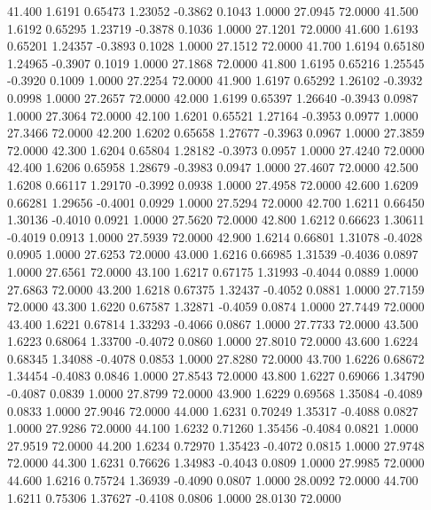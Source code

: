   41.400   1.6191   0.65473   1.23052  -0.3862   0.1043   1.0000  27.0945  72.0000
  41.500   1.6192   0.65295   1.23719  -0.3878   0.1036   1.0000  27.1201  72.0000
  41.600   1.6193   0.65201   1.24357  -0.3893   0.1028   1.0000  27.1512  72.0000
  41.700   1.6194   0.65180   1.24965  -0.3907   0.1019   1.0000  27.1868  72.0000
  41.800   1.6195   0.65216   1.25545  -0.3920   0.1009   1.0000  27.2254  72.0000
  41.900   1.6197   0.65292   1.26102  -0.3932   0.0998   1.0000  27.2657  72.0000
  42.000   1.6199   0.65397   1.26640  -0.3943   0.0987   1.0000  27.3064  72.0000
  42.100   1.6201   0.65521   1.27164  -0.3953   0.0977   1.0000  27.3466  72.0000
  42.200   1.6202   0.65658   1.27677  -0.3963   0.0967   1.0000  27.3859  72.0000
  42.300   1.6204   0.65804   1.28182  -0.3973   0.0957   1.0000  27.4240  72.0000
  42.400   1.6206   0.65958   1.28679  -0.3983   0.0947   1.0000  27.4607  72.0000
  42.500   1.6208   0.66117   1.29170  -0.3992   0.0938   1.0000  27.4958  72.0000
  42.600   1.6209   0.66281   1.29656  -0.4001   0.0929   1.0000  27.5294  72.0000
  42.700   1.6211   0.66450   1.30136  -0.4010   0.0921   1.0000  27.5620  72.0000
  42.800   1.6212   0.66623   1.30611  -0.4019   0.0913   1.0000  27.5939  72.0000
  42.900   1.6214   0.66801   1.31078  -0.4028   0.0905   1.0000  27.6253  72.0000
  43.000   1.6216   0.66985   1.31539  -0.4036   0.0897   1.0000  27.6561  72.0000
  43.100   1.6217   0.67175   1.31993  -0.4044   0.0889   1.0000  27.6863  72.0000
  43.200   1.6218   0.67375   1.32437  -0.4052   0.0881   1.0000  27.7159  72.0000
  43.300   1.6220   0.67587   1.32871  -0.4059   0.0874   1.0000  27.7449  72.0000
  43.400   1.6221   0.67814   1.33293  -0.4066   0.0867   1.0000  27.7733  72.0000
  43.500   1.6223   0.68064   1.33700  -0.4072   0.0860   1.0000  27.8010  72.0000
  43.600   1.6224   0.68345   1.34088  -0.4078   0.0853   1.0000  27.8280  72.0000
  43.700   1.6226   0.68672   1.34454  -0.4083   0.0846   1.0000  27.8543  72.0000
  43.800   1.6227   0.69066   1.34790  -0.4087   0.0839   1.0000  27.8799  72.0000
  43.900   1.6229   0.69568   1.35084  -0.4089   0.0833   1.0000  27.9046  72.0000
  44.000   1.6231   0.70249   1.35317  -0.4088   0.0827   1.0000  27.9286  72.0000
  44.100   1.6232   0.71260   1.35456  -0.4084   0.0821   1.0000  27.9519  72.0000
  44.200   1.6234   0.72970   1.35423  -0.4072   0.0815   1.0000  27.9748  72.0000
  44.300   1.6231   0.76626   1.34983  -0.4043   0.0809   1.0000  27.9985  72.0000
  44.600   1.6216   0.75724   1.36939  -0.4090   0.0807   1.0000  28.0092  72.0000
  44.700   1.6211   0.75306   1.37627  -0.4108   0.0806   1.0000  28.0130  72.0000

